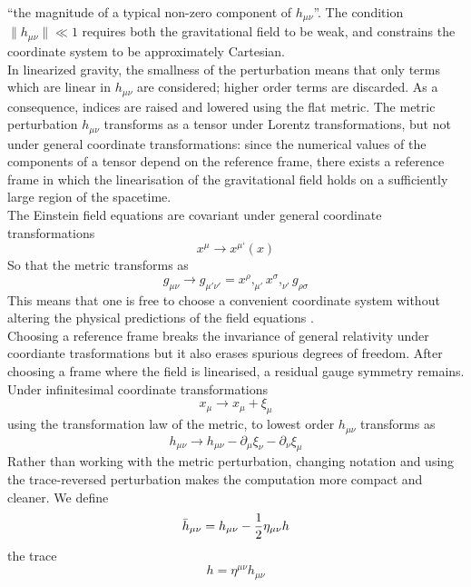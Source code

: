 \documentclass[binding=0.6cm, LaM]{sapthesis}
\begin{document}
	“the magnitude of a typical non-zero component of $h_{\mu\nu}$”. 
	The condition $\|h_{\mu\nu}\|\ll 1$ requires both the gravitational field to be weak, 
	and constrains the coordinate system to be approximately Cartesian.  \\
	In linearized gravity, the smallness of the perturbation means that only terms which are linear in $h_{\mu\nu}$ are considered;
	higher order terms are discarded. As a consequence, indices are raised and lowered using the flat metric. 
	The metric perturbation $h_{\mu\nu}$ transforms as a tensor under Lorentz transformations, 
	but not under general coordinate transformations: since the numerical values of the components
	of a tensor depend on the reference frame, there exists a reference frame in which 
	the linearisation of the gravitational field holds on a sufficiently large region of the spacetime. \\
	The Einstein field equations are covariant under general coordinate transformations
		\begin{equation}
		x^{\mu} \rightarrow x^{\mu ‘}(x)
		\end{equation}
	So that the metric transforms as
		\begin{equation}
		g_{\mu\nu} \rightarrow g_{\mu' \nu'} = x^{\rho},_{\mu'}x^{\sigma},_{\nu'}g_{\rho \sigma}
		\end{equation}
	This means that one is free to choose a convenient coordinate system without 
	altering the physical predictions of the field equations \cite{16}. \\
	Choosing a reference frame breaks the invariance of general relativity under 
	coordiante trasformations but it also erases spurious degrees of freedom. 
	After choosing a frame where the field is linearised, 
	a residual gauge symmetry remains. \\
	Under infinitesimal coordinate transformations
                 \[
			x_{\mu} \rightarrow x_{\mu} + \xi_{\mu}
                \]
	using the transformation law of the metric, to lowest order $h_{\mu\nu}$ transforms as	
		\[
			h_{\mu\nu} \rightarrow h_{\mu\nu} - \partial_{\mu}\xi_{\nu} - \partial_{\nu}\xi_{\mu}
		\]
	Rather than working with the metric perturbation, changing notation and using the trace-reversed perturbation 
	makes the computation more compact and cleaner. We define
		\begin{equation}
			{\bar h}_{\mu\nu} = h_{\mu\nu} - {1 \over {2}}\eta_{\mu\nu}h  
		\end{equation}
	the trace
		\begin{equation}
			h = \eta^{\mu\nu}h_{\mu\nu}
		\end{equation}
\end{document}
